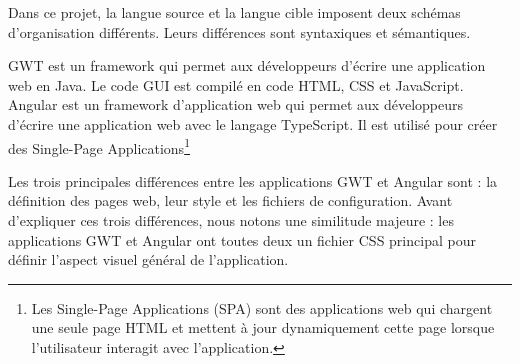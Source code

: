 \documentclass[a4paper]{article}
\begin{document}
Dans ce projet, la langue source et la langue cible imposent deux schémas d'organisation différents. 
Leurs différences sont syntaxiques et sémantiques.

GWT est un framework qui permet aux développeurs d'écrire une application web en Java.
Le code GUI est compilé en code HTML, CSS et JavaScript.
Angular est un framework d'application web qui
  permet aux développeurs d'écrire une application web avec le langage TypeScript.
Il est utilisé pour créer des Single-Page Applications\footnote{Les Single-Page Applications (SPA) sont des applications web qui chargent une seule page HTML et mettent à jour dynamiquement cette page lorsque l'utilisateur interagit avec l'application.}

Les trois principales différences entre 
  les applications GWT et Angular sont : la définition des pages web, leur style et les fichiers de configuration.
Avant d'expliquer ces trois différences, nous notons une similitude majeure : 
  les applications GWT et Angular ont toutes deux un fichier CSS principal pour définir l'aspect visuel général de l'application.
\end{document}
